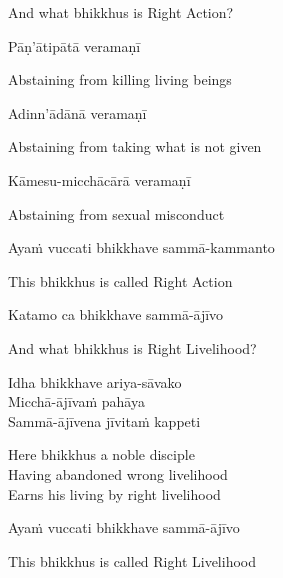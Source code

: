 \begin{english}
  And what bhikkhus is Right Action?
\end{english}

Pāṇ'ātipātā veramaṇī

\begin{english}
  Abstaining from killing living beings
\end{english}

Adinn'ādānā veramaṇī

\begin{english}
  Abstaining from taking what is not given
\end{english}

Kāmesu-micchācārā veramaṇī

\begin{english}
  Abstaining from sexual misconduct
\end{english}

Ayaṁ vuccati bhikkhave sammā-kammanto

\begin{english}
  This bhikkhus is called Right Action
\end{english}

Katamo ca bhikkhave sammā-ājīvo

\begin{english}
  And what bhikkhus is Right Livelihood?\makeatletter\hyperlink{endnote157-appendix}\makeatother
\end{english}

Idha bhikkhave ariya-sāvako\\
Micchā-ājīvaṁ pahāya\\
Sammā-ājīvena jīvitaṁ kappeti

\begin{english-verses}
  Here bhikkhus a noble disciple\\
  Having abandoned wrong livelihood\\
  Earns his living by right livelihood
\end{english-verses}

Ayaṁ vuccati bhikkhave sammā-ājīvo

\begin{english}
  This bhikkhus is called Right Livelihood
\end{english}


